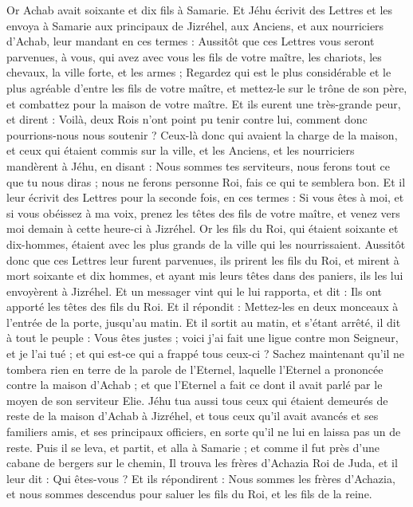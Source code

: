 \begin{multicols}{2}
\VerseOne{}Or Achab avait soixante et dix fils à Samarie. Et Jéhu écrivit des Lettres et les envoya à Samarie aux principaux de Jizréhel, aux Anciens, et aux nourriciers d'Achab, leur mandant en ces termes :
Aussitôt que ces Lettres vous seront parvenues, à vous, qui avez avec vous les fils de votre maître, les chariots, les chevaux, la ville forte, et les armes ;
Regardez qui est le plus considérable et le plus agréable d'entre les fils de votre maître, et mettez-le sur le trône de son père, et combattez pour la maison de votre maître.
Et ils eurent une très-grande peur, et dirent : Voilà, deux Rois n'ont point pu tenir contre lui, comment donc pourrions-nous nous soutenir ?
Ceux-là donc qui avaient la charge de la maison, et ceux qui étaient commis sur la ville, et les Anciens, et les nourriciers mandèrent à Jéhu, en disant : Nous sommes tes serviteurs, nous ferons tout ce que tu nous diras ; nous ne ferons personne Roi, fais ce qui te semblera bon.
Et il leur écrivit des Lettres pour la seconde fois, en ces termes : Si vous êtes à moi, et si vous obéissez à ma voix, prenez les têtes des fils de votre maître, et venez vers moi demain à cette heure-ci à Jizréhel. Or les fils du Roi, qui étaient soixante et dix-hommes, étaient avec les plus grands de la ville qui les nourrissaient.
Aussitôt donc que ces Lettres leur furent parvenues, ils prirent les fils du Roi, et mirent à mort soixante et dix hommes, et ayant mis leurs têtes dans des paniers, ils les lui envoyèrent à Jizréhel.
Et un messager vint qui le lui rapporta, et dit : Ils ont apporté les têtes des fils du Roi. Et il répondit : Mettez-les en deux monceaux à l'entrée de la porte, jusqu'au matin.
Et il sortit au matin, et s'étant arrêté, il dit à tout le peuple : Vous êtes justes ; voici j'ai fait une ligue contre mon Seigneur, et je l'ai tué ; et qui est-ce qui a frappé tous ceux-ci ?
Sachez maintenant qu'il ne tombera rien en terre de la parole de l'Eternel, laquelle l'Eternel a prononcée contre la maison d'Achab ; et que l'Eternel a fait ce dont il avait parlé par le moyen de son serviteur Elie.
Jéhu tua aussi tous ceux qui étaient demeurés de reste de la maison d'Achab à Jizréhel, et tous ceux qu'il avait avancés et ses familiers amis, et ses principaux officiers, en sorte qu'il ne lui en laissa pas un de reste.
Puis il se leva, et partit, et alla à Samarie ; et comme il fut près d'une cabane de bergers sur le chemin,
Il trouva les frères d'Achazia Roi de Juda, et il leur dit : Qui êtes-vous ? Et ils répondirent : Nous sommes les frères d'Achazia, et nous sommes descendus pour saluer les fils du Roi, et les fils de la reine.

\end{multicols}
